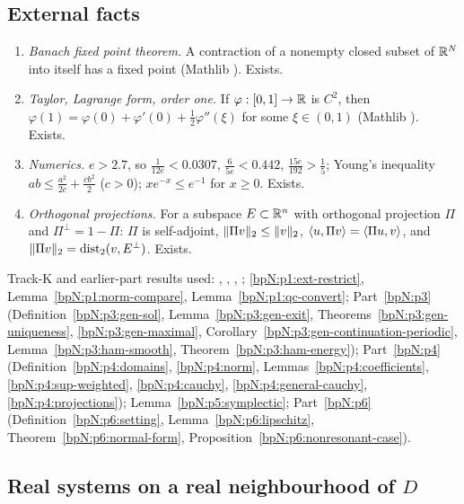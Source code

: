 \subsection{External facts}\label{bpN:p7:s-ext}
\begin{enumerate}[label=(E\arabic*),leftmargin=2.2em]
\item\label{bpN:p7:ext-banach} \emph{Banach fixed point theorem.} A contraction of a nonempty closed subset of $\mathbb{R}^N$ into itself has a fixed point (Mathlib ). Exists.
\item\label{bpN:p7:ext-taylor} \emph{Taylor, Lagrange form, order one.} If $\varphi:[0,1]\to\mathbb{R}$ is $C^2$, then $\varphi(1)=\varphi(0)+\varphi'(0)+\frac12\varphi''(\xi)$ for some $\xi\in(0,1)$ (Mathlib ). Exists.
\item\label{bpN:p7:ext-num} \emph{Numerics.} $e>2.7$, so $\frac1{12e}<0.0307$, $\frac{6}{5e}<0.442$, $\frac{15e}{192}>\frac15$; Young's inequality $ab\le\frac{a^2}{2c}+\frac{cb^2}2$ ($c>0$); $xe^{-x}\le e^{-1}$ for $x\ge0$. Exists.
\item\label{bpN:p7:ext-linalg} \emph{Orthogonal projections.} For a subspace $E\subset\mathbb{R}^n$ with orthogonal projection $\Pi$ and $\Pi^\perp=1-\Pi$: $\Pi$ is self-adjoint, $\lVert \Pi v\rVert_2\le\lVert v\rVert_2$, $\langle u,\Pi v\rangle=\langle \Pi u,v\rangle$, and $\lVert \Pi v\rVert_2=\operatorname{dist}_2(v,E^\perp)$. Exists.
\end{enumerate}
Track-K and earlier-part results used: , , , ; \ref{bpN:p1:ext-restrict}, Lemma~\ref{bpN:p1:norm-compare}, Lemma~\ref{bpN:p1:qc-convert}; Part~\ref{bpN:p3} (Definition~\ref{bpN:p3:gen-sol}, Lemma~\ref{bpN:p3:gen-exit}, Theorems~\ref{bpN:p3:gen-uniqueness}, \ref{bpN:p3:gen-maximal}, Corollary~\ref{bpN:p3:gen-continuation-periodic}, Lemma~\ref{bpN:p3:ham-smooth}, Theorem~\ref{bpN:p3:ham-energy}); Part~\ref{bpN:p4} (Definition~\ref{bpN:p4:domains}, \ref{bpN:p4:norm}, Lemmas~\ref{bpN:p4:coefficients}, \ref{bpN:p4:sup-weighted}, \ref{bpN:p4:cauchy}, \ref{bpN:p4:general-cauchy}, \ref{bpN:p4:projections}); Lemma~\ref{bpN:p5:symplectic}; Part~\ref{bpN:p6} (Definition~\ref{bpN:p6:setting}, Lemma~\ref{bpN:p6:lipschitz}, Theorem~\ref{bpN:p6:normal-form}, Proposition~\ref{bpN:p6:nonresonant-case}).

\subsection{Real systems on a real neighbourhood of $D$}\label{bpN:p7:s-real}


